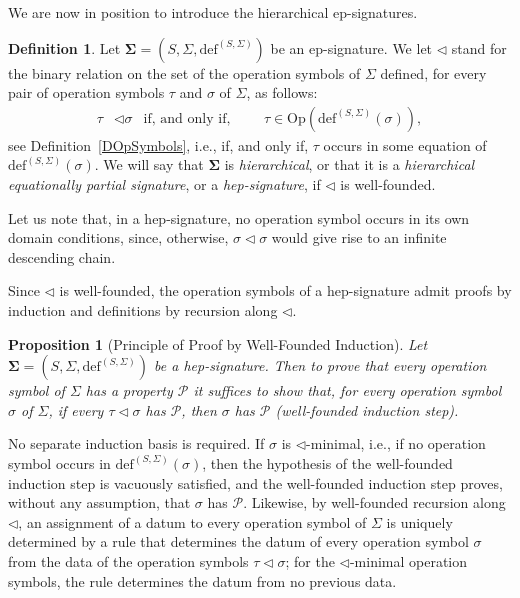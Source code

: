 \documentclass[a4paper, reqno
]{amsart}
\newcommand{\sig}[1]{\mathbf{#1}}             %
\theoremstyle{plain}
\newtheorem{proposition}[theorem]{Proposition}
\theoremstyle{definition}
\newtheorem{definition}[theorem]{Definition}
\begin{document}
We are now in position to introduce the hierarchical ep-signatures.

\begin{definition}\label{DHepSignature}
Let $\sig{\Sigma}=(S,\Sigma,\mathrm{def}^{(S,\Sigma)})$ be an ep-signature.
We let $\lhd$ stand for the binary relation on the set of the operation symbols of $\Sigma$ defined, for every pair of operation symbols $\tau$ and $\sigma$ of $\Sigma$, as follows:
\begin{align*}
\tau&\lhd\sigma
&\mbox{if, and only if,}&&
&\tau\in\mathrm{Op}\left(\mathrm{def}^{(S,\Sigma)}(\sigma)\right),
\end{align*}
see Definition~\ref{DOpSymbols}, i.e., if, and only if, $\tau$ occurs in some equation of $\mathrm{def}^{(S,\Sigma)}(\sigma)$.
We will say that $\sig{\Sigma}$ is \emph{hierarchical}, or that it is a \emph{hierarchical equationally partial signature}, or a \emph{hep-signature}, if $\lhd$ is well-founded.
\end{definition}

Let us note that, in a hep-signature, no operation symbol occurs in its own domain conditions, since, otherwise, $\sigma\lhd\sigma$ would give rise to an infinite descending chain.

Since $\lhd$ is well-founded, the operation symbols of a hep-signature admit proofs by induction and definitions by recursion along $\lhd$.

\begin{proposition}[Principle of Proof by Well-Founded Induction]\label{PPWFI}
Let $\sig{\Sigma}=(S,\Sigma,\mathrm{def}^{(S,\Sigma)})$ be a hep-signature.
Then to prove that every operation symbol of $\Sigma$ has a property $\mathcal{P}$ it suffices to show that, for every operation symbol $\sigma$ of $\Sigma$, if every $\tau\lhd\sigma$ has $\mathcal{P}$, then $\sigma$ has $\mathcal{P}$ (well-founded induction step).
\end{proposition}

No separate induction basis is required.
If $\sigma$ is $\lhd$-minimal, i.e., if no operation symbol occurs in $\mathrm{def}^{(S,\Sigma)}(\sigma)$, then the hypothesis of the well-founded induction step is vacuously satisfied, and the well-founded induction step proves, without any assumption, that $\sigma$ has $\mathcal{P}$.
Likewise, by well-founded recursion along $\lhd$, an assignment of a datum to every operation symbol of $\Sigma$ is uniquely determined by a rule that determines the datum of every operation symbol $\sigma$ from the data of the operation symbols $\tau\lhd\sigma$; for the $\lhd$-minimal operation symbols, the rule determines the datum from no previous data.
\end{document}
